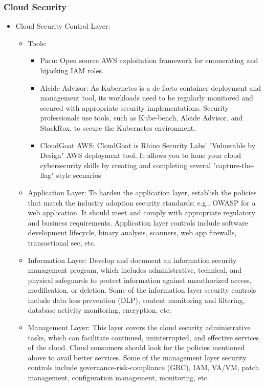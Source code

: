 \subsubsection{Cloud Security}
\begin{itemize}
    \item Cloud Security Control Layer:
    \begin{itemize}
        \item Tools:
        \begin{itemize}
            \item Pacu: Open source AWS exploitation framework for enumerating and hijacking IAM roles.
            \item Alcide Advisor: As Kubernetes is a de facto container deployment and management tool, its workloads need to be regularly monitored and secured with appropriate security implementations. Security professionals use tools, such as Kube-bench, Alcide Advisor, and StackRox, to secure the Kubernetes environment.
            \item CloudGoat AWS: CloudGoat is Rhino Security Labs' "Vulnerable by Design" AWS deployment tool. It allows you to hone your cloud cybersecurity skills by creating and completing several "capture-the-flag" style scenarios
        \end{itemize}
        \item Application Layer: To harden the application layer, establish the policies that match the industry adoption security standards; e.g., OWASP for a web application. It should meet and comply with appropriate regulatory and business requirements. Application layer controls include software development lifecycle, binary analysis, scanners, web app firewalls, transactional sec, etc.
        \item Information Layer: Develop and document an information security management program, which includes administrative, technical, and physical safeguards to protect information against unauthorized access, modification, or deletion. Some of the information layer security controls include data loss prevention (DLP), content monitoring and filtering, database activity monitoring, encryption, etc.
        \item Management Layer: This layer covers the cloud security administrative tasks, which can facilitate continued, uninterrupted, and effective services of the cloud. Cloud consumers should look for the policies mentioned above to avail better services. Some of the management layer security controls include governance-risk-compliance (GRC), IAM, VA/VM, patch management, configuration management, monitoring, etc.

\end{itemize}
\end{itemize}
